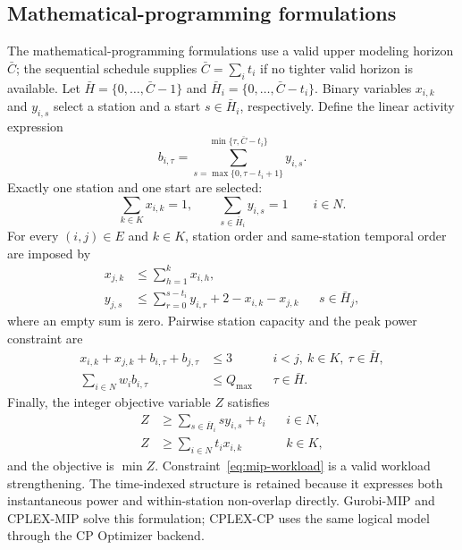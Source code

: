 \documentclass[]{interact}
\theoremstyle{plain}
\theoremstyle{definition}
\theoremstyle{remark}
\newcommand{\Qmax}{Q_{\max}}
\begin{document}
\subsection{Mathematical-programming formulations}

The mathematical-programming formulations use a valid upper modeling horizon $\bar C$; the sequential schedule supplies $\bar C=\sum_i t_i$ if no tighter valid horizon is available. Let $\bar H=\{0,\ldots,\bar C-1\}$ and $\bar H_i=\{0,\ldots,\bar C-t_i\}$. Binary variables $x_{i,k}$ and $y_{i,s}$ select a station and a start $s\in\bar H_i$, respectively. Define the linear activity expression
\begin{equation}
b_{i,\tau}=\sum_{s=\max\{0,\tau-t_i+1\}}^{\min\{\tau,\bar C-t_i\}}y_{i,s}.
\label{eq:mip-activity}
\end{equation}
Exactly one station and one start are selected:
\begin{equation}
\sum_{k\in K}x_{i,k}=1,
\qquad
\sum_{s\in\bar H_i}y_{i,s}=1
\qquad i\in N.
\label{eq:mip-one}
\end{equation}
For every $(i,j)\in E$ and $k\in K$, station order and same-station temporal order are imposed by
\begin{align}
x_{j,k}&\leq\sum_{h=1}^{k}x_{i,h}, \label{eq:mip-station-prec}\\
y_{j,s}&\leq\sum_{r=0}^{s-t_i}y_{i,r}+2-x_{i,k}-x_{j,k}
&&s\in\bar H_j, \label{eq:mip-time-prec}
\end{align}
where an empty sum is zero. Pairwise station capacity and the peak power constraint are
\begin{align}
x_{i,k}+x_{j,k}+b_{i,\tau}+b_{j,\tau}&\leq3
&&i<j,\ k\in K,\ \tau\in\bar H, \label{eq:mip-nonoverlap}\\
\sum_{i\in N}w_i b_{i,\tau}&\leq\Qmax
&&\tau\in\bar H. \label{eq:mip-power}
\end{align}
Finally, the integer objective variable $Z$ satisfies
\begin{align}
Z&\geq\sum_{s\in\bar H_i}s y_{i,s}+t_i &&i\in N, \label{eq:mip-z}\\
Z&\geq\sum_{i\in N}t_i x_{i,k} &&k\in K, \label{eq:mip-workload}
\end{align}
and the objective is $\min Z$. Constraint~\eqref{eq:mip-workload} is a valid workload strengthening. The time-indexed structure is retained because it expresses both instantaneous power and within-station non-overlap directly. Gurobi-MIP and CPLEX-MIP solve this formulation; CPLEX-CP uses the same logical model through the CP Optimizer backend.
\end{document}

